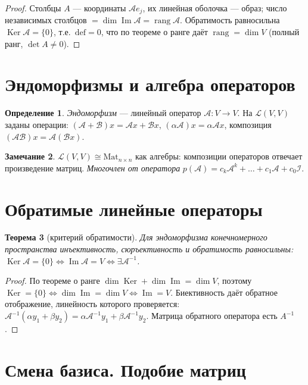 \documentclass[11pt,a4paper]{article}
\theoremstyle{definition}
\newtheorem{definition}{Определение}[section]
\newtheorem{remark}[definition]{Замечание}
\theoremstyle{plain}
\newtheorem{theorem}[definition]{Теорема}
\DeclareMathOperator{\rang}{rang}
\DeclareMathOperator{\Ker}{Ker}
\DeclareMathOperator{\Img}{Im}
\begin{document}
\begin{proof}
Столбцы $A$ — координаты $\mathcal Ae_j$, их линейная оболочка — образ; число независимых столбцов
$=\dim\Img\mathcal A=\rang\mathcal A$. Обратимость равносильна $\Ker\mathcal A=\{0\}$, т.е.\
$\mathrm{def}=0$, что по теореме о ранге даёт $\rang=\dim V$ (полный ранг, $\det A\ne0$).
\end{proof}

\section{Эндоморфизмы и алгебра операторов}

\begin{definition}
\emph{Эндоморфизм} — линейный оператор $\mathcal A\colon V\to V$. На $\mathcal L(V,V)$ заданы
операции: $(\mathcal A+\mathcal B)x=\mathcal Ax+\mathcal Bx$, $(\alpha\mathcal A)x=\alpha\mathcal Ax$,
композиция $(\mathcal A\mathcal B)x=\mathcal A(\mathcal Bx)$.
\end{definition}

\begin{remark}
$\mathcal L(V,V)\cong\mathrm{Mat}_{n\times n}$ как алгебры: композиции операторов отвечает
произведение матриц. \emph{Многочлен от оператора}
$p(\mathcal A)=c_k\mathcal A^k+\dots+c_1\mathcal A+c_0\mathcal I$.
\end{remark}

\section{Обратимые линейные операторы}

\begin{theorem}[критерий обратимости]
Для эндоморфизма конечномерного пространства инъективность, сюръективность и обратимость
равносильны: $\Ker\mathcal A=\{0\}\iff\Img\mathcal A=V\iff\exists\mathcal A^{-1}$.
\end{theorem}

\begin{proof}
По теореме о ранге $\dim\Ker+\dim\Img=\dim V$, поэтому $\Ker=\{0\}\iff\dim\Img=\dim V\iff\Img=V$.
Биективность даёт обратное отображение, линейность которого проверяется:
$\mathcal A^{-1}(\alpha y_1+\beta y_2)=\alpha\mathcal A^{-1}y_1+\beta\mathcal A^{-1}y_2$. Матрица
обратного оператора есть $A^{-1}$.
\end{proof}

\section{Смена базиса. Подобие матриц}
\end{document}
